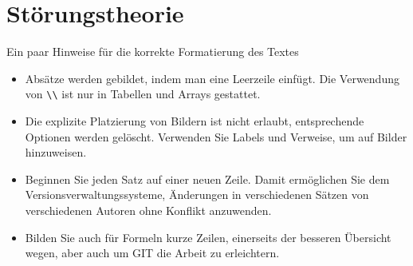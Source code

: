 %
%
%
\chapter{Störungstheorie\label{chapter:perturbation}}
\begin{refsection}

Ein paar Hinweise für die korrekte Formatierung des Textes
\begin{itemize}
\item
Absätze werden gebildet, indem man eine Leerzeile einfügt.
Die Verwendung von \verb+\\+ ist nur in Tabellen und Arrays gestattet.
\item
Die explizite Platzierung von Bildern ist nicht erlaubt, entsprechende
Optionen werden gelöscht. 
Verwenden Sie Labels und Verweise, um auf Bilder hinzuweisen.
\item
Beginnen Sie jeden Satz auf einer neuen Zeile. 
Damit ermöglichen Sie dem Versionsverwaltungssysteme, Änderungen
in verschiedenen Sätzen von verschiedenen Autoren ohne Konflikt 
anzuwenden.
\item 
Bilden Sie auch für Formeln kurze Zeilen, einerseits der besseren
Übersicht wegen, aber auch um GIT die Arbeit zu erleichtern.
\end{itemize}






\printbibliography[heading=subbibliography]
\end{refsection}
